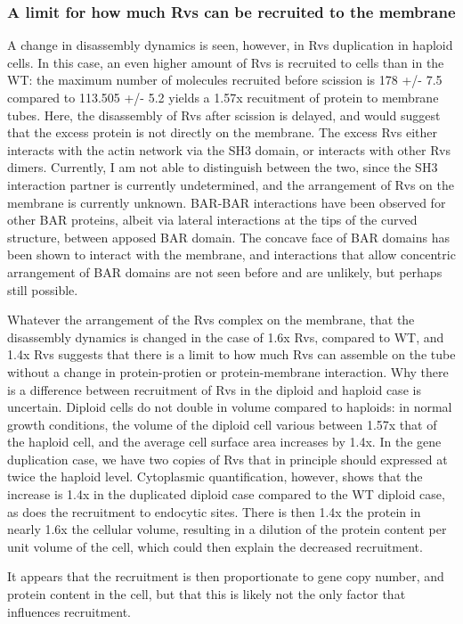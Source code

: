 \subsubsection{A limit for how much Rvs can be recruited to the membrane}
A change in disassembly dynamics is seen, however, in Rvs duplication in haploid cells. In this case, an even higher amount of Rvs is recruited to cells than in the WT: the maximum number of molecules recruited before scission is 178 +/- 7.5 compared to 113.505 +/- 5.2 yields a 1.57x recuitment of protein to membrane tubes. Here, the disassembly of Rvs after scission is delayed, and would suggest that the excess protein is not directly on the membrane. The excess Rvs either interacts with the actin network via the SH3 domain, or interacts with other Rvs dimers. Currently, I am not able to distinguish between the two, since the SH3 interaction partner is currently undetermined, and the arrangement of Rvs on the membrane is currently unknown. BAR-BAR interactions have been observed for other BAR proteins, albeit via lateral interactions at the tips of the curved structure, between apposed BAR domain. The concave face of BAR domains has been shown to interact with the membrane, and interactions that allow concentric arrangement of BAR domains are not seen before and are unlikely, but perhaps still possible.

Whatever the arrangement of the Rvs complex on the membrane, that the disassembly dynamics is changed in the case of 1.6x Rvs, compared to WT, and 1.4x Rvs suggests that there is a limit to how much Rvs can assemble on the tube without a change in protein-protien or protein-membrane interaction. Why there is a difference between recruitment of Rvs in the diploid and haploid case is uncertain. Diploid cells do not double in volume compared to haploids: in normal growth conditions, the volume of the diploid cell various between 1.57x that of the haploid cell, and the average cell surface area increases by 1.4x. In the gene duplication case, we have two copies of Rvs that in principle should expressed at twice the haploid level. Cytoplasmic quantification, however, shows that the increase is 1.4x in the duplicated diploid case compared to the WT diploid case, as does the recruitment to endocytic sites. There is then 1.4x the protein in nearly 1.6x the cellular volume, resulting in a dilution of the protein content per unit volume of the cell, which could then explain the decreased recruitment. 

It appears that the recruitment is then proportionate to gene copy number, and protein content in the cell, but that this is likely not the only factor that influences recruitment. 

